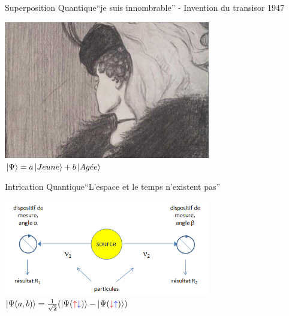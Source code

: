 \documentclass{beamer}
\begin{document}
\begin{frame}{Superposition Quantique}{``je suis innombrable'' - Invention du transisor 1947}
  \begin{center}
    \includegraphics[width=9cm]{3604843-inline.jpg}\\
    \vspace{0.5cm}
    $\ket{\Psi} = a \ket{Jeune} + b \ket{Ag\acute{e}e}$ 
  \end{center}
\end{frame}

\begin{frame}{Intrication Quantique}{``L'espace et le temps n'existent pas''}
  \begin{center}
        \includegraphics[width=9cm]{intrication.png}\\
    \vspace{0.5cm}
    $\ket{\Psi(a, b)} = \frac{1}{\sqrt{2}}(\ket{\Psi(\color{red}\uparrow\color{blue}\downarrow\color{black})} - \ket{\Psi(\color{red}\downarrow\color{blue}\uparrow\color{black})})$
  \end{center}
\end{frame}
\end{document}
